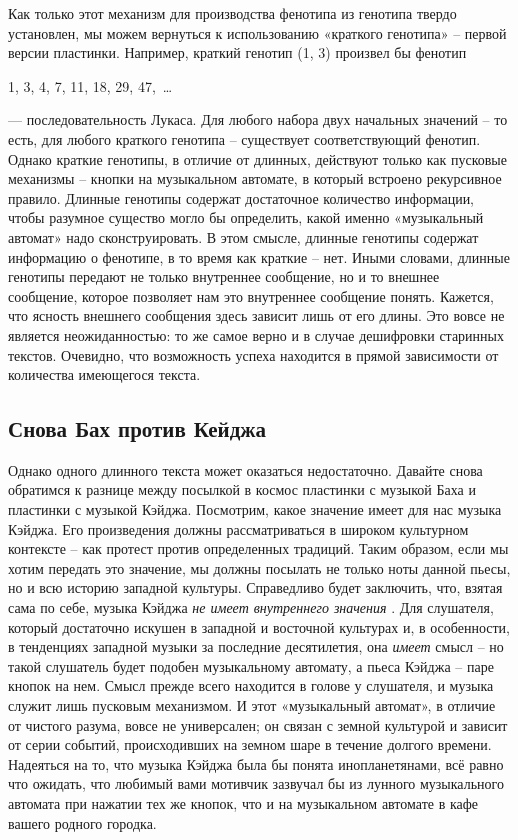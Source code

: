 \documentclass[../main.tex]{subfiles}
\begin{document}
Как только этот механизм для производства фенотипа из генотипа твердо установлен, мы можем вернуться к использованию «краткого генотипа» \--- первой версии пластинки. Например, краткий генотип (1, 3) произвел бы фенотип

1, 3, 4, 7, 11, 18, 29, 47,~\ldots{}

--- последовательность Лукаса. Для любого набора двух начальных значений \--- то есть, для любого краткого генотипа \--- существует соответствующий фенотип. Однако краткие генотипы, в отличие от длинных, действуют только как пусковые механизмы \--- кнопки на музыкальном автомате, в который встроено рекурсивное правило. Длинные генотипы содержат достаточное количество информации, чтобы разумное существо могло бы определить, какой именно «музыкальный автомат» надо сконструировать. В этом смысле, длинные генотипы содержат информацию о фенотипе, в то время как краткие \--- нет. Иными словами, длинные генотипы передают не только внутреннее сообщение, но и то внешнее сообщение, которое позволяет нам это внутреннее сообщение понять. Кажется, что ясность внешнего сообщения здесь зависит лишь от его длины. Это вовсе не является неожиданностью: то же самое верно и в случае дешифровки старинных текстов. Очевидно, что возможность успеха находится в прямой зависимости от количества имеющегося текста.


\subsection{Снова Бах против Кейджа}

Однако одного длинного текста может оказаться недостаточно. Давайте снова обратимся к разнице между посылкой в космос пластинки с музыкой Баха и пластинки с музыкой Кэйджа. Посмотрим, какое значение имеет для нас музыка Кэйджа. Его произведения должны рассматриваться в широком культурном контексте \--- как протест против определенных традиций. Таким образом, если мы хотим передать это значение, мы должны посылать не только ноты данной пьесы, но и всю историю западной культуры. Справедливо будет заключить, что, взятая сама по себе, музыка Кэйджа \emph{не имеет внутреннего значения} . Для слушателя, который достаточно искушен в западной и восточной культурах и, в особенности, в тенденциях западной музыки за последние десятилетия, она \emph{имеет} смысл \--- но такой слушатель будет подобен музыкальному автомату, а пьеса Кэйджа \--- паре кнопок на нем. Смысл прежде всего находится в голове у слушателя, и музыка служит лишь пусковым механизмом. И этот «музыкальный автомат», в отличие от чистого разума, вовсе не универсален; он связан с земной культурой и зависит от серии событий, происходивших на земном шаре в течение долгого времени. Надеяться на то, что музыка Кэйджа была бы понята инопланетянами, всё равно что ожидать, что любимый вами мотивчик зазвучал бы из лунного музыкального автомата при нажатии тех же кнопок, что и на музыкальном автомате в кафе вашего родного городка.
\end{document}
